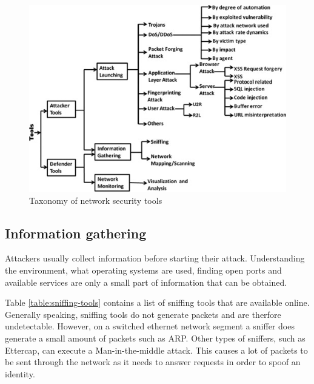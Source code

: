 \documentclass[conference]{IEEEtran}
\begin{document}
\begin{figure}[htbp]  
\centerline{\includegraphics[scale=.65]{network-tools.jpg}}
\caption{Taxonomy of network security tools \cite{b1}}
\end{figure}

\subsection{Information gathering}
Attackers usually collect information before starting their attack. Understanding the environment, what operating systems are used, finding open ports and available services are only a small part of information that can be obtained. 

\smallskip Table \ref{table:sniffing-tools} contains a list of sniffing tools that are available online. Generally speaking, sniffing tools do not generate packets and are therfore undetectable. However, on a switched ethernet network segment a sniffer does generate a small amount of packets such as ARP\cite{b9}. Other types of sniffers, such as Ettercap, can execute a Man-in-the-middle attack. This causes a lot of packets to be sent through the network as it needs to answer requests in order to spoof an identity.
\end{document}
